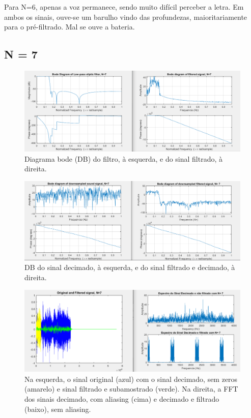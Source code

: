\documentclass{article}
\begin{document}
\raggedright
\vspace{5mm} %

Para N=6, apenas a voz permanece, sendo muito difícil perceber a letra.
Em ambos os sinais, ouve-se um barulho vindo das profundezas, maioritariamente para o pré-filtrado.
Mal se ouve a bateria.

\newpage

\subsection{N = 7}
\vfill
\begin{figure}[h!]
\centering
\includegraphics[scale=0.5]{matlab_test_images/cut_images/fil17.PNG}
\caption{Diagrama bode (DB) do filtro, à esquerda, e do sinal filtrado, à direita.}
\label{fig:matlab_test_images/cut_images/fil17}
\end{figure}
\begin{figure}[h!]
\centering
\includegraphics[scale=0.5]{matlab_test_images/cut_images/fil18.PNG}
\caption{DB do sinal decimado, à esquerda, e do sinal filtrado e decimado, à direita.}
\label{fig:matlab_test_images/cut_images/fil18}
\end{figure}  
\newpage
\begin{figure}[h!]
\centering
\includegraphics[scale=0.5]{matlab_test_images/cut_images/fil19.PNG}
\caption{Na esquerda, o sinal original (azul) com o sinal decimado, sem zeros (amarelo) e sinal filtrado e subamostrado (verde). Na direita, a FFT dos sinais decimado, com aliasing (cima) e decimado e filtrado (baixo), sem aliasing.}
\label{fig:matlab_test_images/cut_images/fil19}
\end{figure}  
\end{document}
